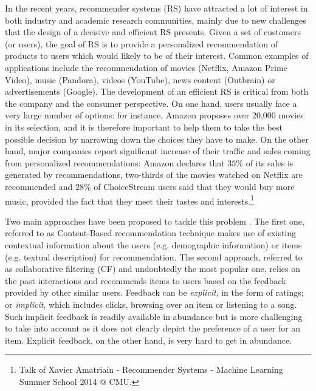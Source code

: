 \documentclass[10pt,journal,compsoc]{IEEEtran}
\begin{document}
\begin{sloppypar}
In the recent years, recommender systems (RS) have attracted a lot of interest in both industry and academic research communities, mainly due to new challenges that the design of a decisive and efficient RS presents. Given a set of customers (or users), the goal of RS is to provide a personalized recommendation of products to users which would likely to be of their interest. Common examples of applications include the recommendation of movies (Netflix, Amazon Prime Video), music (Pandora), videos (YouTube), news content (Outbrain) or advertisements (Google). The development of an efficient RS is critical from both the company and the consumer perspective. On one hand, users usually face a very large number of options: for instance, Amazon proposes over 20,000 movies in its selection, and it is therefore important to help them to take the best possible decision by narrowing down the choices they have to make. On the other hand, major companies report significant increase of their traffic and sales coming from personalized recommendations: Amazon declares that $35\%$ of its sales is generated by recommendations, two-thirds of the movies watched on Netflix are recommended and $28\%$ of ChoiceStream users said that they would buy more music, provided the fact that they meet their tastes and interests.\footnote{Talk of Xavier Amatriain - Recommender Systems - Machine Learning Summer School 2014 @ CMU.}

\smallskip


Two main approaches have been proposed to tackle this problem \cite{Ricci:2010:RSH:1941884}. The first
one, referred to as Content-Based recommendation technique \cite{reference/rsh/LopsGS11} makes use of existing contextual information about the users (e.g. demographic information) or items (e.g. textual description) for recommendation. The second approach, referred to as collaborative filtering (CF) and undoubtedly the most popular one, relies on the past interactions and recommends items to users based on the feedback provided by other similar users. Feedback can be {\it explicit}, in the form of ratings; or {\it implicit}, which includes clicks, browsing over an item or listening to a song. Such implicit feedback is readily available in abundance but is more challenging to take into account as it does not clearly depict the preference of a user for an item. Explicit feedback, on the other hand, is very hard to get in abundance.

\smallskip


\end{sloppypar}
\end{document}
